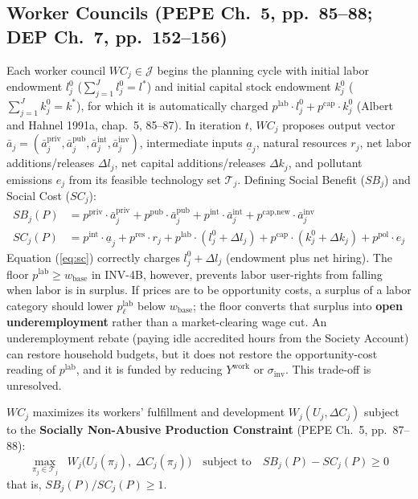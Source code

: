 \documentclass[10pt,twoside,openany]{book}
\theoremstyle{dpepstyle}
\begin{document}
\subsection{Worker Councils (PEPE Ch.~5, pp.~85--88; DEP Ch.~7, pp.~152--156)}
Each worker council $WC_j \in \mathcal{J}$ begins the planning cycle with initial labor endowment $l_j^0$ ($\sum_{j=1}^J l_j^0 = l^*$) and initial capital stock endowment $k_j^0$ ($\sum_{j=1}^J k_j^0 = k^*$), for which it is automatically charged $p^{\text{lab}} \cdot l_j^0 + p^{\text{cap}} \cdot k_j^0$ (Albert and Hahnel 1991a, chap.~5, 85--87). In iteration $t$, $WC_j$ proposes output vector $\bar{a}_j = (\bar{a}_j^{\text{priv}}, \bar{a}_j^{\text{pub}}, \bar{a}_j^{\text{int}}, \bar{a}_j^{\text{inv}})$, intermediate inputs $\underline{a}_j$, natural resources $r_j$, net labor additions/releases $\Delta l_j$, net capital additions/releases $\Delta k_j$, and pollutant emissions $e_j$ from its feasible technology set $\mathcal{T}_j$. Defining Social Benefit ($SB_j$) and Social Cost ($SC_j$):
\begin{align}
  SB_j(P) &= p^{\text{priv}} \cdot \bar{a}_j^{\text{priv}} + p^{\text{pub}} \cdot \bar{a}_j^{\text{pub}} + p^{\text{int}} \cdot \bar{a}_j^{\text{int}} + p^{\text{cap,new}} \cdot \bar{a}_j^{\text{inv}} \label{eq:sb} \\
  SC_j(P) &= p^{\text{int}} \cdot \underline{a}_j + p^{\text{res}} \cdot r_j + p^{\text{lab}} \cdot (l_j^0 + \Delta l_j) + p^{\text{cap}} \cdot (k_j^0 + \Delta k_j) + p^{\text{pol}} \cdot e_j \label{eq:sc}
\end{align}
Equation (\ref{eq:sc}) correctly charges $l_j^0 + \Delta l_j$ (endowment plus net hiring). The floor $p^{\text{lab}} \ge w_{\text{base}}$ in INV-4B, however, prevents labor user-rights from falling when labor is in surplus. If prices are to be opportunity costs, a surplus of a labor category should lower $p^{\text{lab}}_\ell$ below $w_{\text{base}}$; the floor converts that surplus into \textbf{open underemployment} rather than a market-clearing wage cut. An underemployment rebate (paying idle accredited hours from the Society Account) can restore household budgets, but it does not restore the opportunity-cost reading of $p^{\text{lab}}$, and it is funded by reducing $Y^{\text{work}}$ or $\sigma_{\text{inv}}$. This trade-off is unresolved.

$WC_j$ maximizes its workers' fulfillment and development $W_j(U_j, \Delta C_j)$ subject to the \textbf{Socially Non-Abusive Production Constraint} (PEPE Ch.~5, pp.~87--88):
\begin{equation}
  \max_{\pi_j \in \mathcal{T}_j} \;\; W_j\Big(U_j(\pi_j), \; \Delta C_j(\pi_j)\Big) \quad \text{subject to} \quad SB_j(P) - SC_j(P) \ge 0 \label{eq:wc-opt}
\end{equation}
that is, $SB_j(P)/SC_j(P) \ge 1$.
\end{document}
